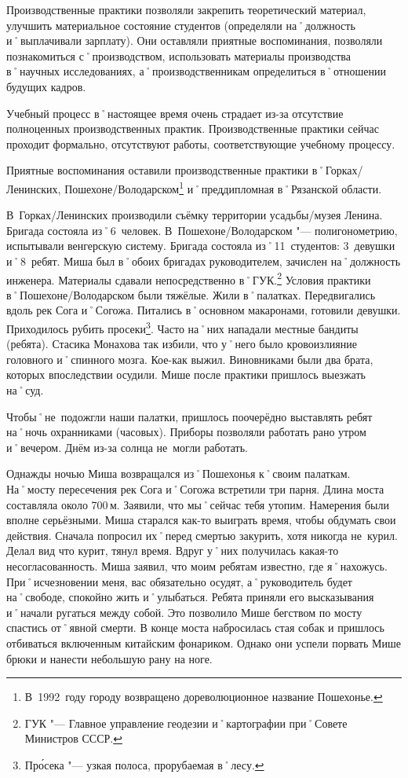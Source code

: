 Производственные практики позволяли закрепить теоретический материал, улучшить материальное состояние студентов (определяли на˚должность и˚выплачивали зарплату). Они оставляли приятные воспоминания, позволяли познакомиться с˚производством, использовать материалы производства в˚научных исследованиях, а˚производственникам определиться в˚отношении будущих кадров.

Учебный процесс в˚настоящее время очень страдает из-за отсутствие полноценных производственных практик. Производственные практики сейчас проходит формально, отсутствуют работы, соответствующие учебному процессу. 

Приятные воспоминания оставили производственные практики в˚Горках\-/Ленинских, Пошехоне\-/Володарском\footnote{В~1992~году городу возвращено дореволюционное название Пошехонье.} и˚преддипломная в˚Рязанской области.

В~Горках\-/Ленинских производили съёмку территории усадьбы\-/музея Ленина. Бригада состояла из˚6~человек. В~Пошехоне\-/Володарском "--- полигонометрию, испытывали венгерскую систему. Бригада состояла из˚11~студентов: 3~девушки и˚8~ребят. Миша был в˚обоих бригадах руководителем, зачислен на˚должность инженера. Материалы сдавали непосредственно в˚ГУК.\footnote{ГУК "--- Главное управление геодезии и˚картографии при˚Совете Министров СССР.} Условия практики в˚Пошехоне\-/Володарском были тяжёлые. Жили в˚палатках. Передвигались вдоль рек Сога и˚Согожа. Питались в˚основном макаронами, готовили девушки. Приходилось рубить просеки\footnote{Пр\'{о}сека "--- узкая полоса, прорубаемая в˚лесу.}. Часто на˚них нападали местные бандиты (ребята). Стасика Монахова так избили, что у˚него было кровоизлияние головного и˚спинного мозга. Кое-как выжил. Виновниками были два брата, которых впоследствии осудили. Мише после практики пришлось выезжать на˚суд. 

Чтобы˚не~подожгли наши палатки, пришлось поочерёдно выставлять ребят на˚ночь охранниками (часовых). Приборы позволяли работать рано утром и˚вечером. Днём из-за солнца не~могли работать. 

Однажды ночью Миша возвращался из˚Пошехонья к˚своим палаткам. На˚мосту пересечения рек Сога и˚Согожа встретили три парня. Длина моста составляла около 700\,м. Заявили, что мы˚сейчас тебя утопим. Намерения были вполне серьёзными. Миша старался как-то выиграть время, чтобы обдумать свои действия. Сначала попросил их˚перед смертью закурить, хотя никогда не~курил. Делал вид что курит, тянул время. Вдруг у˚них получилась какая-то несогласованность. Миша заявил, что моим ребятам известно, где я˚нахожусь. При˚исчезновении меня, вас обязательно осудят, а˚руководитель будет на˚свободе, спокойно жить и˚улыбаться. Ребята приняли его высказывания и˚начали ругаться между собой. Это позволило Мише бегством по мосту спастись от˚явной смерти. В конце моста набросилась стая собак и пришлось отбиваться включенным китайским фонариком. Однако они успели порвать Мише брюки и нанести небольшую рану на ноге.

